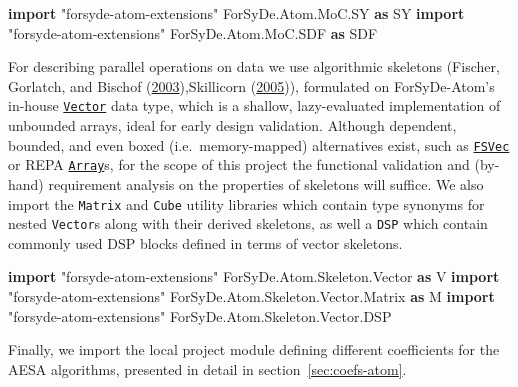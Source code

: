 \documentclass[
  a4paper,
]{article}
\newenvironment{Shaded}{}{}
\newcommand{\DataTypeTok}[1]{\textcolor[rgb]{0.56,0.13,0.00}{#1}}
\newcommand{\KeywordTok}[1]{\textcolor[rgb]{0.00,0.44,0.13}{\textbf{#1}}}
\newcommand{\NormalTok}[1]{#1}
\begin{document}
\begin{Shaded}
\begin{Highlighting}[numbers=left,,firstnumber=57,]
\KeywordTok{import}\NormalTok{ "forsyde-atom-extensions" }\DataTypeTok{ForSyDe.Atom.MoC.SY}  \KeywordTok{as} \DataTypeTok{SY}
\KeywordTok{import}\NormalTok{ "forsyde-atom-extensions" }\DataTypeTok{ForSyDe.Atom.MoC.SDF} \KeywordTok{as} \DataTypeTok{SDF}
\end{Highlighting}
\end{Shaded}

For describing parallel operations on data we use algorithmic skeletons
(Fischer, Gorlatch, and Bischof
(\protect\hyperlink{ref-Fischer-2003}{2003}),Skillicorn
(\protect\hyperlink{ref-skillicorn05}{2005})), formulated on
ForSyDe-Atom's in-house
\href{http://hackage.haskell.org/package/forsyde-shallow/docs/ForSyDe-Shallow-Core-Vector.html}{\texttt{Vector}}
data type, which is a shallow, lazy-evaluated implementation of
unbounded arrays, ideal for early design validation. Although dependent,
bounded, and even boxed (i.e.~memory-mapped) alternatives exist, such as
\href{http://hackage.haskell.org/package/parameterized-data/docs/Data-Param-FSVec.html}{\texttt{FSVec}}
or REPA \href{http://hackage.haskell.org/package/repa}{\texttt{Array}}s,
for the scope of this project the functional validation and (by-hand)
requirement analysis on the properties of skeletons will suffice. We
also import the \texttt{Matrix} and \texttt{Cube} utility libraries
which contain type synonyms for nested \texttt{Vector}s along with their
derived skeletons, as well a \texttt{DSP} which contain commonly used
DSP blocks defined in terms of vector skeletons.

\begin{Shaded}
\begin{Highlighting}[numbers=left,,firstnumber=74,]
\KeywordTok{import}\NormalTok{ "forsyde-atom-extensions" }\DataTypeTok{ForSyDe.Atom.Skeleton.Vector}        \KeywordTok{as} \DataTypeTok{V}
\KeywordTok{import}\NormalTok{ "forsyde-atom-extensions" }\DataTypeTok{ForSyDe.Atom.Skeleton.Vector.Matrix} \KeywordTok{as} \DataTypeTok{M}
\KeywordTok{import}\NormalTok{ "forsyde-atom-extensions" }\DataTypeTok{ForSyDe.Atom.Skeleton.Vector.DSP}
\end{Highlighting}
\end{Shaded}

Finally, we import the local project module defining different
coefficients for the AESA algorithms, presented in detail in
section~\ref{sec:coefs-atom}.
\end{document}
